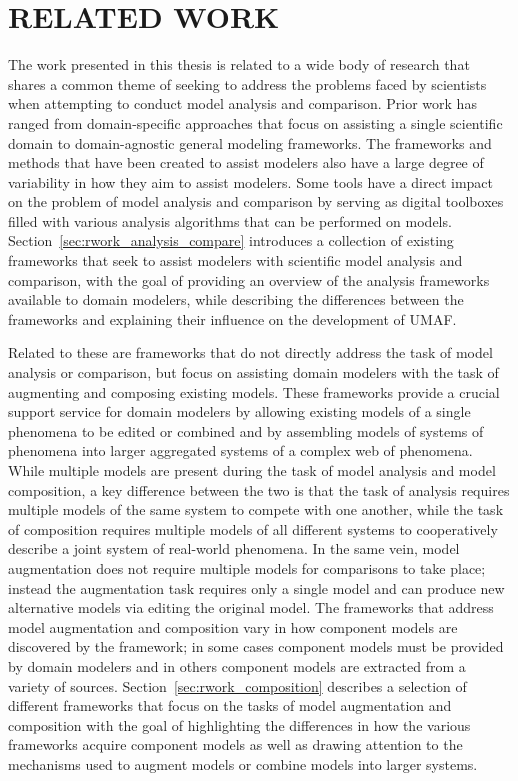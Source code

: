 \chapter{RELATED WORK\label{chapter:related_work}}
The work presented in this thesis is related to a wide body of research that shares a common theme of seeking to address the problems faced by scientists when attempting to conduct model analysis and comparison.
Prior work has ranged from domain-specific approaches that focus on assisting a single scientific domain to domain-agnostic general modeling frameworks.
The frameworks and methods that have been created to assist modelers also have a large degree of variability in how they aim to assist modelers.
Some tools have a direct impact on the problem of model analysis and comparison by serving as digital toolboxes filled with various analysis algorithms that can be performed on models.
Section~\ref{sec:rwork_analysis_compare} introduces a collection of existing frameworks that seek to assist modelers with scientific model analysis and comparison, with the goal of providing an overview of the analysis frameworks available to domain modelers, while describing the differences between the frameworks and explaining their influence on the development of UMAF.

Related to these are frameworks that do not directly address the task of model analysis or comparison, but focus on assisting domain modelers with the task of augmenting and composing existing models.
These frameworks provide a crucial support service for domain modelers by allowing existing models of a single phenomena to be edited or combined and by assembling models of systems of phenomena into larger aggregated systems of a complex web of phenomena.
While multiple models are present during the task of model analysis and model composition, a key difference between the two is that the task of analysis requires multiple models of the same system to compete with one another, while the task of composition requires multiple models of all different systems to cooperatively describe a joint system of real-world phenomena.
In the same vein, model augmentation does not require multiple models for comparisons to take place; instead the augmentation task requires only a single model and can produce new alternative models via editing the original model.
The frameworks that address model augmentation and composition vary in how component models are discovered by the framework; in some cases component models must be provided by domain modelers and in others component models are extracted from a variety of sources.
Section~\ref{sec:rwork_composition} describes a selection of different frameworks that focus on the tasks of model augmentation and composition with the goal of highlighting the differences in how the various frameworks acquire component models as well as drawing attention to the mechanisms used to augment models or combine models into larger systems.

